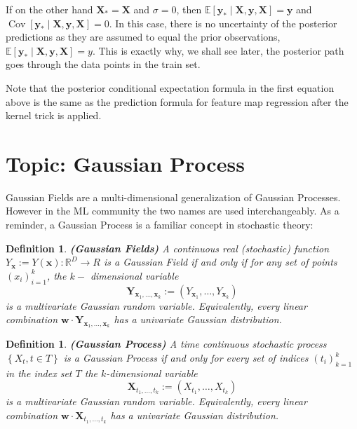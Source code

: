 \documentclass[11pt]{article}
\theoremstyle{plain} %
\newtheorem{definition}[theorem]{Definition}
\theoremstyle{remark}
\begin{document}
If on the other hand $\mathbf{X}_{*}=\mathbf{X}$ and $\sigma=0$, then
$\mathbb{E}\left[\mathbf{y}_{*} \mid \mathbf{X}, \mathbf{y},
    \mathbf{X}\right]=\mathbf{y}$ and $\operatorname{Cov}\left[\mathbf{y}_{*} \mid
    \mathbf{X}, \mathbf{y}, \mathbf{X}\right]=0$. In this case, there is no uncertainty of the
posterior predictions as they are assumed to equal the prior observations,
$\mathbb{E}\left[\mathbf{y}_{*} \mid \mathbf{X}, \mathbf{y},
    \mathbf{X}\right]=y$. This is exactly why, we shall see later, the posterior path goes through the data points in the train set.

Note that the posterior conditional expectation formula in the first equation
above is the same as the prediction formula for feature map regression after
the kernel trick is applied.

\section{Topic: Gaussian Process}

Gaussian Fields are a multi-dimensional generalization of Gaussian Processes.
However in the ML community the two names are used interchangeably. As a
reminder, a Gaussian Process is a familiar concept in stochastic theory:

\begin{definition}\textbf{(Gaussian Fields)}
  A continuous real (stochastic) function $Y_{\mathbf{x}}:=Y(\mathbf{x}):
    \mathbb{R}^{D} \rightarrow R$ is a Gaussian Field if and only if for any set of
  points $\left(x_{i}\right)_{i=1}^{k}$, the $k-$ dimensional variable
  $$
    \mathbf{Y}_{\mathbf{x}_{1}, \ldots, \mathbf{x}_{k}}:=\left(Y_{\mathbf{x}_{1}}, \ldots, Y_{\mathbf{x}_{k}}\right)
  $$
  is a multivariate Gaussian random variable. Equivalently, every linear
  combination $\mathbf{w} \cdot \mathbf{Y}_{\mathbf{x}_{1}, \ldots,
    \mathbf{x}_{k}}$ has a univariate Gaussian distribution.
\end{definition}

\begin{definition}\textbf{(Gaussian Process)}
  A time continuous stochastic process $\left\{X_{t}, t \in T\right\}$ is a
  Gaussian Process if and only for every set of indices
  $\left(t_{i}\right)_{k=1}^{k}$ in the index set $T$ the $k$-dimensional variable
  $$
    \mathbf{X}_{t_{1}, \ldots, t_{k}}:=\left(X_{t_{1}}, \ldots, X_{t_{k}}\right)
  $$
  is a multivariate Gaussian random variable. Equivalently, every linear
  combination $\mathbf{w} \cdot \mathbf{X}_{t_{1}, \ldots, t_{k}}$ has a
  univariate Gaussian distribution.
\end{definition}
\end{document}
